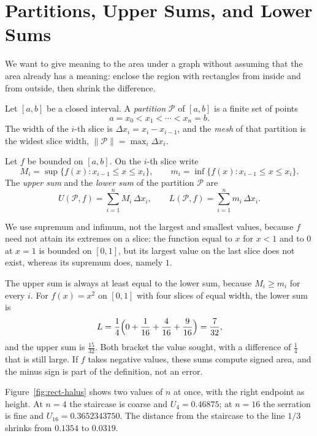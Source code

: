 \section{Partitions, Upper Sums, and Lower Sums}

We want to give meaning to the area under a graph without assuming that the area already
has a meaning: enclose the region with rectangles from inside and from outside, then
shrink the difference.

\begin{definisi}
Let $[a,b]$ be a closed interval. A \emph{partition} $\mathcal{P}$ of $[a,b]$
is a finite set of points
\[
a=x_0<x_1<\cdots<x_n=b .
\]
The width of the $i$-th slice is $\Delta x_i=x_i-x_{i-1}$, and the \emph{mesh} of that partition
is the widest slice width, $\|\mathcal{P}\|=\max_i\Delta x_i$.

Let $f$ be bounded on $[a,b]$. On the $i$-th slice write
\[
M_i=\sup\{f(x):x_{i-1}\le x\le x_i\},\qquad
m_i=\inf\{f(x):x_{i-1}\le x\le x_i\}.
\]
The \emph{upper sum} and the \emph{lower sum} of the partition $\mathcal{P}$ are
\begin{equation}
U(\mathcal{P},f)=\sum_{i=1}^{n}M_i\,\Delta x_i,
\qquad
L(\mathcal{P},f)=\sum_{i=1}^{n}m_i\,\Delta x_i .
\end{equation}
\end{definisi}

We use supremum and infimum, not the largest and smallest values, because $f$ need not
attain its extremes on a slice: the function equal to $x$ for $x<1$ and to $0$
at $x=1$ is bounded on $[0,1]$, but its largest value on the last slice does
not exist, whereas its supremum does, namely $1$.

The upper sum is always at least equal to the lower sum, because $M_i\ge m_i$ for
every $i$. For $f(x)=x^2$ on $[0,1]$ with four slices of equal width, the lower
sum is
\[
L=\frac{1}{4}\Bigl(0+\frac{1}{16}+\frac{4}{16}+\frac{9}{16}\Bigr)=\frac{7}{32},
\]
and the upper sum is $\frac{15}{32}$. Both bracket the value sought, with a difference of
$\frac14$ that is still large. If $f$ takes negative values, these sums compute signed
area, and the minus sign is part of the definition, not an error.

Figure~\ref{fig:rect-halus} shows two values of $n$ at once, with the right endpoint
as height. At $n=4$ the staircase is coarse and $U_4=0.46875$; at $n=16$ the serration is
fine and $U_{16}=0.3652343750$. The distance from the staircase to the line $1/3$ shrinks from $0.1354$
to $0.0319$.


